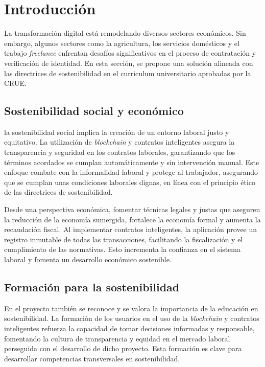
\section{Introducción}

La transformación digital está remodelando diversos sectores económicos. Sin embargo, algunos sectores como la agricultura, los servicios domésticos y el trabajo \textit{freelance} enfrentan desafíos significativos en el proceso de contratación y verificación de identidad.
En esta sección, se propone una solución alineada con las directrices de sostenibilidad en el curriculum universitario aprobadas por la CRUE.


\subsection{Sostenibilidad social y económico}

la sostenibilidad social implica la creación de un entorno laboral justo y equitativo.
La utilización de \textit{blockchain} y contratos inteligentes asegura la transparencia y seguridad en los contratos laborales, garantizando que los términos acordados se cumplan automáticamente y sin intervención manual. 
Este enfoque combate con la informalidad laboral y protege al trabajador, asegurando que se cumplan unas condiciones laborales dignas, en línea con el principio ético de las directrices de sostenibilidad. 

Desde una perspectiva económica, fomentar técnicas legales y justas que aseguren la reducción de la economía sumergida, fortalece la economía formal y aumenta la recaudación fiscal.
Al implementar contratos inteligentes, la aplicación provee un registro inmutable de todas las transacciones, facilitando la fiscalización y el cumplimiento de las normativas.
Esto incrementa la confianza en el sistema laboral y fomenta un desarrollo económico sostenible.


\subsection{Formación para la sostenibilidad}

En el proyecto también se reconoce y se valora la importancia de la educación en sostenibilidad. La formación de los usuarios en el uso de la \textit{blockchain} y contratos inteligentes refuerza la capacidad de tomar decisiones informadas y responsable, fomentando la cultura de transparencia y equidad en el mercado laboral perseguida con el desarrollo de dicho proyecto.
Esta formación es clave para desarrollar competencias transversales en sostenibilidad.


